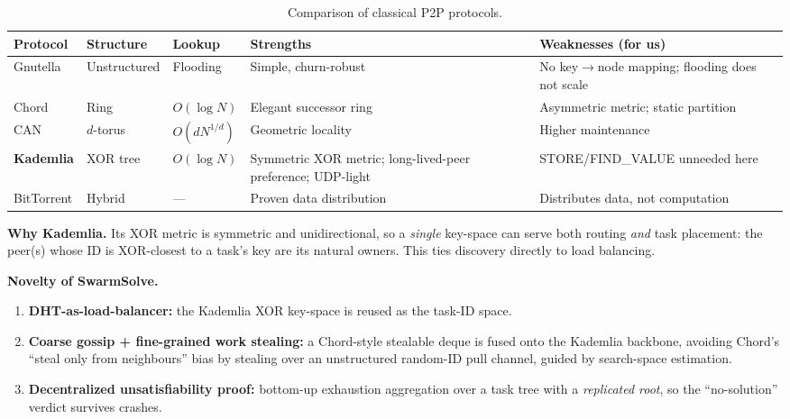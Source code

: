 \documentclass[11pt,a4paper]{article}
\begin{document}
\begin{table}[htbp]
  \centering
  \caption{Comparison of classical P2P protocols.}
  \small
  \begin{tabular}{@{}l l l p{3.4cm} p{3.6cm}@{}}
    \toprule
    \textbf{Protocol} & \textbf{Structure} & \textbf{Lookup} & \textbf{Strengths} & \textbf{Weaknesses (for us)}\\
    \midrule
    Gnutella & Unstructured & Flooding & Simple, churn-robust & No key$\to$node mapping; flooding does not scale\\
    Chord & Ring & $O(\log N)$ & Elegant successor ring & Asymmetric metric; static partition\\
    CAN & $d$-torus & $O(dN^{1/d})$ & Geometric locality & Higher maintenance\\
    \textbf{Kademlia} & XOR tree & $O(\log N)$ & Symmetric XOR metric; long-lived-peer preference; UDP-light & STORE/FIND\_VALUE unneeded here\\
    BitTorrent & Hybrid & --- & Proven data distribution & Distributes data, not computation\\
    \bottomrule
  \end{tabular}
\end{table}

\textbf{Why Kademlia.} Its XOR metric is symmetric and unidirectional, so a \emph{single}
key-space can serve both routing \emph{and} task placement: the peer(s) whose ID is XOR-closest
to a task's key are its natural owners. This ties discovery directly to load balancing.

\textbf{Novelty of SwarmSolve.}
\begin{enumerate}[leftmargin=1.4em,itemsep=2pt]
  \item \textbf{DHT-as-load-balancer:} the Kademlia XOR key-space is reused as the task-ID space.
  \item \textbf{Coarse gossip + fine-grained work stealing:} a Chord-style stealable deque is
        fused onto the Kademlia backbone, avoiding Chord's ``steal only from neighbours'' bias by
        stealing over an unstructured random-ID pull channel, guided by search-space estimation.
  \item \textbf{Decentralized unsatisfiability proof:} bottom-up exhaustion aggregation over a
        task tree with a \emph{replicated root}, so the ``no-solution'' verdict survives crashes.
\end{enumerate}

\end{document}
